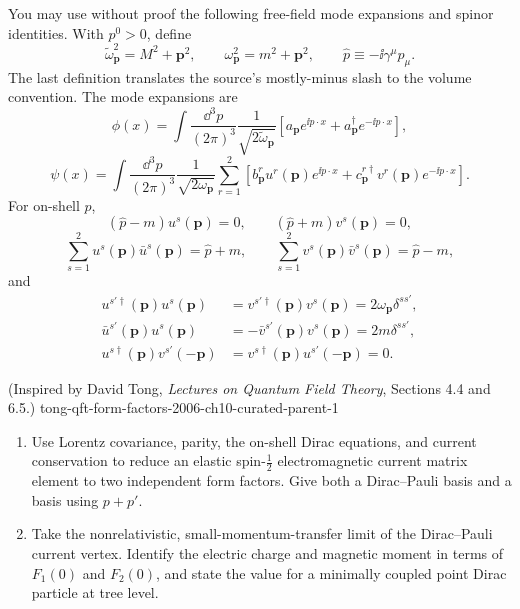 \begin{enumerate}
You may use without proof the following free-field mode expansions and
spinor identities.  With \(p^0>0\), define
\[
 \widetilde\omega_{\mathbf p}^{2}=M^2+\mathbf p^2,
 \qquad \omega_{\mathbf p}^{2}=m^2+\mathbf p^2,
 \qquad \widehat p\equiv-\ii\gamma^\mu p_\mu.
\]
The last definition translates the source's mostly-minus slash to the
volume convention.  The mode expansions are
\[
 \phi(x)=\int\frac{\dd^3p}{(2\pi)^3}\frac1{\sqrt{2\widetilde\omega_{\mathbf p}}}
 \left[a_{\mathbf p}e^{\ii p\cdot x}
 +a_{\mathbf p}^\dagger e^{-\ii p\cdot x}\right],
\]
\[
 \psi(x)=\int\frac{\dd^3p}{(2\pi)^3}\frac1{\sqrt{2\omega_{\mathbf p}}}
 \sum_{r=1}^{2}\left[
 b^r_{\mathbf p}u^r(\mathbf p)e^{\ii p\cdot x}
 +c^{r\dagger}_{\mathbf p}v^r(\mathbf p)e^{-\ii p\cdot x}
 \right].
\]
For on-shell \(p\),
\[
 (\widehat p-m)u^s(\mathbf p)=0,
 \qquad (\widehat p+m)v^s(\mathbf p)=0,
\]
\[
 \sum_{s=1}^{2}u^s(\mathbf p)\bar u^s(\mathbf p)=\widehat p+m,
 \qquad
 \sum_{s=1}^{2}v^s(\mathbf p)\bar v^s(\mathbf p)=\widehat p-m,
\]
and
\[
 \begin{aligned}
 u^{s'\dagger}(\mathbf p)u^s(\mathbf p)
 &=v^{s'\dagger}(\mathbf p)v^s(\mathbf p)
 =2\omega_{\mathbf p}\delta^{ss'},\\
 \bar u^{s'}(\mathbf p)u^s(\mathbf p)
 &=-\bar v^{s'}(\mathbf p)v^s(\mathbf p)
 =2m\delta^{ss'},\\
 u^{s\dagger}(\mathbf p)v^{s'}(-\mathbf p)
 &=v^{s\dagger}(\mathbf p)u^{s'}(-\mathbf p)=0.
 \end{aligned}
\]

  {(Inspired by David Tong, \emph{Lectures on Quantum Field Theory}, Sections 4.4 and 6.5.)}
  {tong-qft-form-factors-2006-ch10-curated-parent-1}
\begin{enumerate}
\item
Use Lorentz covariance, parity, the on-shell Dirac equations, and current
conservation to reduce an elastic spin-\(\tfrac12\) electromagnetic current
matrix element to two independent form factors.  Give both a Dirac--Pauli
basis and a basis using \(p+p'\).
\item
Take the nonrelativistic, small-momentum-transfer limit of the Dirac--Pauli
current vertex.  Identify the electric charge and magnetic moment in terms
of \(F_1(0)\) and \(F_2(0)\), and state the value for a minimally coupled
point Dirac particle at tree level.
\end{enumerate}


\end{enumerate}
